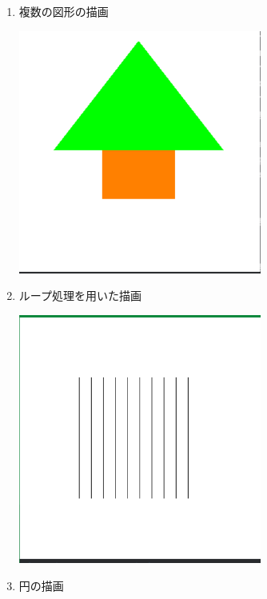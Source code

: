 \documentclass{scrartcl}
\begin{document}
\begin{enumerate}
\item 複数の図形の描画\\

\begin{center}
\includegraphics[width=8cm]{./2017-10-03-03.png}
\end{center}

\item ループ処理を用いた描画\\

\begin{center}
\includegraphics[width=8cm]{./2017-10-03-04.png}
\end{center}

\item 円の描画\\


\end{enumerate}
\end{document}
